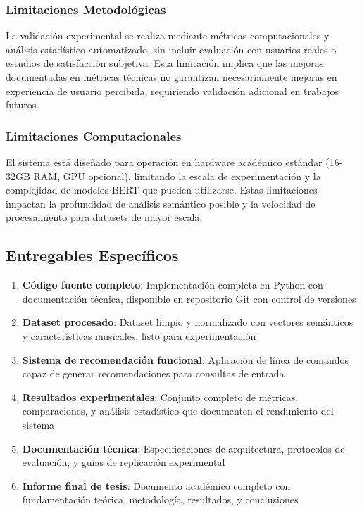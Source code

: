 \documentclass[12pt,a4paper]{article}
\begin{document}
\subsubsection{Limitaciones Metodológicas}

La validación experimental se realiza mediante métricas computacionales y análisis estadístico automatizado, sin incluir evaluación con usuarios reales o estudios de satisfacción subjetiva. Esta limitación implica que las mejoras documentadas en métricas técnicas no garantizan necesariamente mejoras en experiencia de usuario percibida, requiriendo validación adicional en trabajos futuros.

\subsubsection{Limitaciones Computacionales}

El sistema está diseñado para operación en hardware académico estándar (16-32GB RAM, GPU opcional), limitando la escala de experimentación y la complejidad de modelos BERT que pueden utilizarse. Estas limitaciones impactan la profundidad de análisis semántico posible y la velocidad de procesamiento para datasets de mayor escala.

\subsection{Entregables Específicos}

\begin{enumerate}
    \item \textbf{Código fuente completo}: Implementación completa en Python con documentación técnica, disponible en repositorio Git con control de versiones
    \item \textbf{Dataset procesado}: Dataset limpio y normalizado con vectores semánticos y características musicales, listo para experimentación
    \item \textbf{Sistema de recomendación funcional}: Aplicación de línea de comandos capaz de generar recomendaciones para consultas de entrada
    \item \textbf{Resultados experimentales}: Conjunto completo de métricas, comparaciones, y análisis estadístico que documenten el rendimiento del sistema
    \item \textbf{Documentación técnica}: Especificaciones de arquitectura, protocolos de evaluación, y guías de replicación experimental
    \item \textbf{Informe final de tesis}: Documento académico completo con fundamentación teórica, metodología, resultados, y conclusiones
\end{enumerate}
\end{document}
